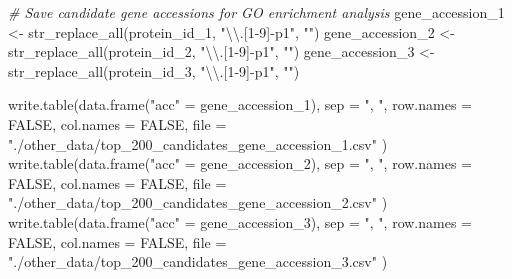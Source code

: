 \documentclass[
  11pt,
  oneside]{book}
\newenvironment{Shaded}{\begin{snugshade}}{\end{snugshade}}
\newcommand{\AttributeTok}[1]{\textcolor[rgb]{0.77,0.63,0.00}{#1}}
\newcommand{\CommentTok}[1]{\textcolor[rgb]{0.56,0.35,0.01}{\textit{#1}}}
\newcommand{\ConstantTok}[1]{\textcolor[rgb]{0.00,0.00,0.00}{#1}}
\newcommand{\FunctionTok}[1]{\textcolor[rgb]{0.00,0.00,0.00}{#1}}
\newcommand{\NormalTok}[1]{#1}
\newcommand{\OtherTok}[1]{\textcolor[rgb]{0.56,0.35,0.01}{#1}}
\newcommand{\SpecialCharTok}[1]{\textcolor[rgb]{0.00,0.00,0.00}{#1}}
\newcommand{\StringTok}[1]{\textcolor[rgb]{0.31,0.60,0.02}{#1}}
\begin{document}
\begin{Shaded}
\begin{Highlighting}[]
\CommentTok{\# Save candidate gene accessions for GO enrichment analysis}
\NormalTok{gene\_accession\_1 }\OtherTok{\textless{}{-}} \FunctionTok{str\_replace\_all}\NormalTok{(protein\_id\_1, }\StringTok{"}\SpecialCharTok{\textbackslash{}\textbackslash{}}\StringTok{.[1{-}9]{-}p1"}\NormalTok{, }\StringTok{""}\NormalTok{)}
\NormalTok{gene\_accession\_2 }\OtherTok{\textless{}{-}} \FunctionTok{str\_replace\_all}\NormalTok{(protein\_id\_2, }\StringTok{"}\SpecialCharTok{\textbackslash{}\textbackslash{}}\StringTok{.[1{-}9]{-}p1"}\NormalTok{, }\StringTok{""}\NormalTok{)}
\NormalTok{gene\_accession\_3 }\OtherTok{\textless{}{-}} \FunctionTok{str\_replace\_all}\NormalTok{(protein\_id\_3, }\StringTok{"}\SpecialCharTok{\textbackslash{}\textbackslash{}}\StringTok{.[1{-}9]{-}p1"}\NormalTok{, }\StringTok{""}\NormalTok{)}

\FunctionTok{write.table}\NormalTok{(}\FunctionTok{data.frame}\NormalTok{(}\StringTok{"acc"} \OtherTok{=}\NormalTok{ gene\_accession\_1),}
  \AttributeTok{sep =} \StringTok{", "}\NormalTok{, }\AttributeTok{row.names =} \ConstantTok{FALSE}\NormalTok{, }\AttributeTok{col.names =} \ConstantTok{FALSE}\NormalTok{,}
  \AttributeTok{file =} \StringTok{"./other\_data/top\_200\_candidates\_gene\_accession\_1.csv"}
\NormalTok{)}
\FunctionTok{write.table}\NormalTok{(}\FunctionTok{data.frame}\NormalTok{(}\StringTok{"acc"} \OtherTok{=}\NormalTok{ gene\_accession\_2),}
  \AttributeTok{sep =} \StringTok{", "}\NormalTok{, }\AttributeTok{row.names =} \ConstantTok{FALSE}\NormalTok{, }\AttributeTok{col.names =} \ConstantTok{FALSE}\NormalTok{,}
  \AttributeTok{file =} \StringTok{"./other\_data/top\_200\_candidates\_gene\_accession\_2.csv"}
\NormalTok{)}
\FunctionTok{write.table}\NormalTok{(}\FunctionTok{data.frame}\NormalTok{(}\StringTok{"acc"} \OtherTok{=}\NormalTok{ gene\_accession\_3),}
  \AttributeTok{sep =} \StringTok{", "}\NormalTok{, }\AttributeTok{row.names =} \ConstantTok{FALSE}\NormalTok{, }\AttributeTok{col.names =} \ConstantTok{FALSE}\NormalTok{,}
  \AttributeTok{file =} \StringTok{"./other\_data/top\_200\_candidates\_gene\_accession\_3.csv"}
\NormalTok{)}
\end{Highlighting}
\end{Shaded}
\end{document}
